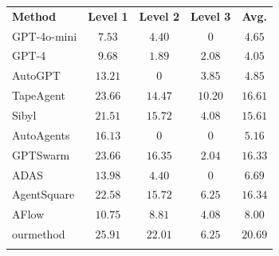   \footnotesize
\begin{tabular}{l|cccc}
    \Xhline{1.2pt}
    \rowcolor{CadetBlue!20}
    \textbf{Method} & \textbf{Level 1} & \textbf{Level 2} & \textbf{Level 3}& \textbf{Avg.} \\
    \Xhline{1pt}
    GPT-4o-mini  & $7.53$ & $4.40$ & $0$ & $4.65$\\
   \rowcolor{gray!10} GPT-4 & $9.68$ & $1.89$ & $2.08$ & $4.05$ \\
    \hline
    AutoGPT & $13.21$ & $0$ & $3.85$ & $4.85$\\
    \rowcolor{gray!10}TapeAgent & \underline{$23.66$} & $14.47$ & $\mathbf{10.20}$ & $16.61$ \\
   Sibyl & $21.51$ & $15.72$ & $4.08$  & $15.61$\\
    \hline
    \rowcolor{gray!10}AutoAgents & $16.13$ & $0$ & $0$ & $5.16$  \\
    GPTSwarm & $23.66$ & $16.35$ & $2.04$ &  \underline{$16.33$}\\
    \rowcolor{gray!10}ADAS & $13.98$ & $4.40$ & $0$ & $6.69$ \\
    AgentSquare & $22.58$ & $15.72$ & $6.25$ & \underline{$16.34$} \\
    \rowcolor{gray!10}AFlow & $10.75$ & $8.81$ & $4.08$ & $8.00$  \\

    \hline
    ourmethod  & \textbf{$\mathbf{25.91}$} & \textbf{$\mathbf{22.01}$} & \underline{$6.25$} &  $\mathbf{20.69}$ \\
    \Xhline{1.2pt}
\end{tabular}
